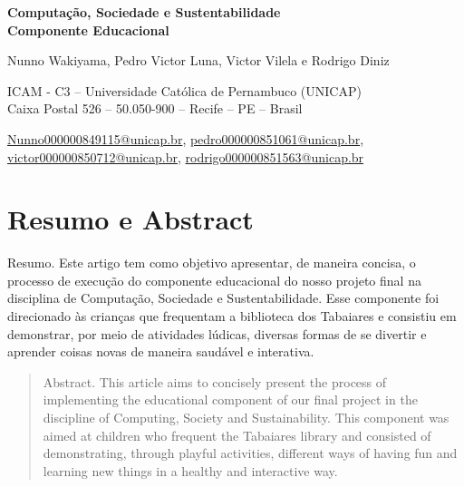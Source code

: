 \documentclass[a4paper,12pt]{article}
\begin{document}
\begin{center}
\LARGE \textbf{Computação, Sociedade e Sustentabilidade\\Componente Educacional} \\
\normalsize

\vspace{1cm}

Nunno Wakiyama, Pedro Victor Luna, Victor Vilela e Rodrigo Diniz \\

\vspace{1cm}

ICAM - C3 -- Universidade Católica de Pernambuco (UNICAP) \\

Caixa Postal 526 -- 50.050-900 -- Recife -- PE -- Brasil \\

\vspace{1cm}

\small{
\href{mailto:Nunno000000849115@unicap.br}{Nunno000000849115@unicap.br}, 
\href{mailto:pedro000000851061@unicap.br}{pedro000000851061@unicap.br}, 
\href{mailto:victor000000850712@unicap.br}{victor000000850712@unicap.br}, 
\href{mailto:rodrigo000000851563@unicap.br}{rodrigo000000851563@unicap.br}
}
\end{center}
\normalsize

\vspace{2cm}

\large
\section{\LARGE{Resumo e Abstract}}

\vspace{0.5cm}


\begin{resumo}
Resumo. Este artigo tem como objetivo apresentar, de maneira concisa, o processo de execução do componente educacional do nosso projeto final na disciplina de Computação, Sociedade e Sustentabilidade. Esse componente foi direcionado às crianças que frequentam a biblioteca dos Tabaiares e consistiu em demonstrar, por meio de atividades lúdicas, diversas formas de se divertir e aprender coisas novas de maneira saudável e interativa. 
\end{resumo}


\begin{abstract}
Abstract. This article aims to concisely present the process of implementing the educational component of our final project in the discipline of Computing, Society and Sustainability. This component was aimed at children who frequent the Tabaiares library and consisted of demonstrating, through playful activities, different ways of having fun and learning new things in a healthy and interactive way. 
\end{abstract}
\newpage
\end{document}
